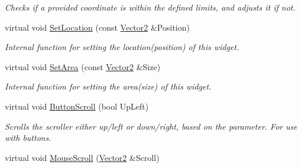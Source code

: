 \begin{DoxyCompactItemize}
\begin{DoxyCompactList}\small\item\em Checks if a provided coordinate is within the defined limits, and adjusts it if not. \item\end{DoxyCompactList}\item 
\hypertarget{classphys_1_1UI_1_1Scrollbar_add3d5f729e542fe17eda663fce86d3a3}{
virtual void \hyperlink{classphys_1_1UI_1_1Scrollbar_add3d5f729e542fe17eda663fce86d3a3}{SetLocation} (const \hyperlink{classphys_1_1Vector2}{Vector2} \&Position)}
\label{d0/d3e/classphys_1_1UI_1_1Scrollbar_add3d5f729e542fe17eda663fce86d3a3}

\begin{DoxyCompactList}\small\item\em Internal function for setting the location(position) of this widget. \item\end{DoxyCompactList}\item 
\hypertarget{classphys_1_1UI_1_1Scrollbar_a82ee692ee5215893d31dab0dd76374ba}{
virtual void \hyperlink{classphys_1_1UI_1_1Scrollbar_a82ee692ee5215893d31dab0dd76374ba}{SetArea} (const \hyperlink{classphys_1_1Vector2}{Vector2} \&Size)}
\label{d0/d3e/classphys_1_1UI_1_1Scrollbar_a82ee692ee5215893d31dab0dd76374ba}

\begin{DoxyCompactList}\small\item\em Internal function for setting the area(size) of this widget. \item\end{DoxyCompactList}\item 
\hypertarget{classphys_1_1UI_1_1Scrollbar_a31a2e11f27f087154fd61d7cc2cd6dc1}{
virtual void \hyperlink{classphys_1_1UI_1_1Scrollbar_a31a2e11f27f087154fd61d7cc2cd6dc1}{ButtonScroll} (bool UpLeft)}
\label{d0/d3e/classphys_1_1UI_1_1Scrollbar_a31a2e11f27f087154fd61d7cc2cd6dc1}

\begin{DoxyCompactList}\small\item\em Scrolls the scroller either up/left or down/right, based on the parameter. For use with buttons. \item\end{DoxyCompactList}\item 
\hypertarget{classphys_1_1UI_1_1Scrollbar_ac50a2cd5b85c8b2ff0cabf22b898a0fa}{
virtual void \hyperlink{classphys_1_1UI_1_1Scrollbar_ac50a2cd5b85c8b2ff0cabf22b898a0fa}{MouseScroll} (\hyperlink{classphys_1_1Vector2}{Vector2} \&Scroll)}
\label{d0/d3e/classphys_1_1UI_1_1Scrollbar_ac50a2cd5b85c8b2ff0cabf22b898a0fa}


\end{DoxyCompactItemize}
